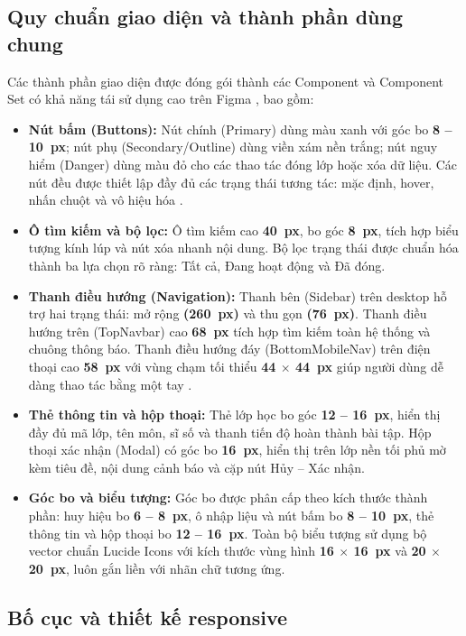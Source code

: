\documentclass[12pt,a4paper,oneside]{report}
\begin{document}
\subsection{Quy chuẩn giao diện và thành phần dùng chung}

Các thành phần giao diện được đóng gói thành các Component và Component Set có khả năng tái sử dụng cao trên Figma \cite{figmaDesignSystem}, bao gồm:
\begin{itemize}
  \item \textbf{Nút bấm (Buttons):} Nút chính (Primary) dùng màu xanh với góc bo \textbf{8 -- 10~px}; nút phụ (Secondary/Outline) dùng viền xám nền trắng; nút nguy hiểm (Danger) dùng màu đỏ cho các thao tác đóng lớp hoặc xóa dữ liệu. Các nút đều được thiết lập đầy đủ các trạng thái tương tác: mặc định, hover, nhấn chuột và vô hiệu hóa \cite{nielsen1994, figmaDesignSystem}.
  \item \textbf{Ô tìm kiếm và bộ lọc:} Ô tìm kiếm cao \textbf{40~px}, bo góc \textbf{8~px}, tích hợp biểu tượng kính lúp và nút xóa nhanh nội dung. Bộ lọc trạng thái được chuẩn hóa thành ba lựa chọn rõ ràng: Tất cả, Đang hoạt động và Đã đóng.
  \item \textbf{Thanh điều hướng (Navigation):} Thanh bên (Sidebar) trên desktop hỗ trợ hai trạng thái: mở rộng \textbf{(260~px)} và thu gọn \textbf{(76~px)}. Thanh điều hướng trên (TopNavbar) cao \textbf{68~px} tích hợp tìm kiếm toàn hệ thống và chuông thông báo. Thanh điều hướng đáy (BottomMobileNav) trên điện thoại cao \textbf{58~px} với vùng chạm tối thiểu \textbf{44 $\times$ 44~px} giúp người dùng dễ dàng thao tác bằng một tay \cite{nielsen1994, wcag22}.
  \item \textbf{Thẻ thông tin và hộp thoại:} Thẻ lớp học bo góc \textbf{12 -- 16~px}, hiển thị đầy đủ mã lớp, tên môn, sĩ số và thanh tiến độ hoàn thành bài tập. Hộp thoại xác nhận (Modal) có góc bo \textbf{16~px}, hiển thị trên lớp nền tối phủ mờ kèm tiêu đề, nội dung cảnh báo và cặp nút Hủy -- Xác nhận.
  \item \textbf{Góc bo và biểu tượng:} Góc bo được phân cấp theo kích thước thành phần: huy hiệu bo \textbf{6 -- 8~px}, ô nhập liệu và nút bấm bo \textbf{8 -- 10~px}, thẻ thông tin và hộp thoại bo \textbf{12 -- 16~px}. Toàn bộ biểu tượng sử dụng bộ vector chuẩn Lucide Icons với kích thước vùng hình \textbf{16 $\times$ 16~px} và \textbf{20 $\times$ 20~px}, luôn gắn liền với nhãn chữ tương ứng.
\end{itemize}

\subsection{Bố cục và thiết kế responsive}
\end{document}

